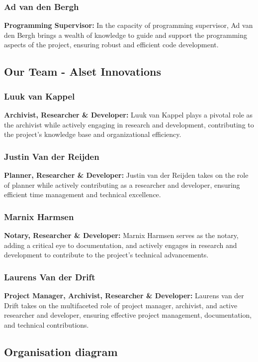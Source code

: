 \subsubsection*{Ad van den Bergh}
\textbf{Programming Supervisor:} In the capacity of programming supervisor, Ad van den Bergh brings a wealth of knowledge to guide and support the programming aspects of the project, ensuring robust and efficient code development.


\subsection{Our Team - Alset Innovations}

\subsubsection*{Luuk van Kappel}
\textbf{Archivist, Researcher \& Developer:} Luuk van Kappel plays a pivotal role as the archivist while actively engaging in research and development, contributing to the project's knowledge base and organizational efficiency.

\subsubsection*{Justin Van der Reijden}
\textbf{Planner, Researcher \& Developer:} Justin van der Reijden takes on the role of planner while actively contributing as a researcher and developer, ensuring efficient time management and technical excellence.

\subsubsection*{Marnix Harmsen}
\textbf{Notary, Researcher \& Developer:} Marnix Harmsen serves as the notary, adding a critical eye to documentation, and actively engages in research and development to contribute to the project's technical advancements.

\subsubsection*{Laurens Van der Drift}
\textbf{Project Manager, Archivist, Researcher \& Developer:} Laurens van der Drift takes on the multifaceted role of project manager, archivist, and active researcher and developer, ensuring effective project management, documentation, and technical contributions.

\newpage
\subsection{Organisation diagram}
\begin{minipage}[t][][b]{\linewidth}
  
    \label{fig:organisation diagram}
\end{minipage}
